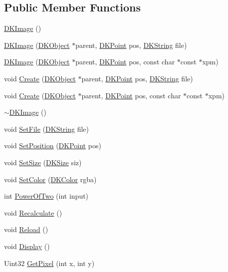 \subsection*{Public Member Functions}
\begin{DoxyCompactItemize}
\item 
\hyperlink{class_d_k_image_a0fb6472b1f681b473283a8be666a0e2f}{D\-K\-Image} ()
\item 
\hyperlink{class_d_k_image_a147d427988ba89b193b6acaf8694736a}{D\-K\-Image} (\hyperlink{class_d_k_object}{D\-K\-Object} $\ast$parent, \hyperlink{_d_k_axis_8h_a0ca1f005fbb936f8e7a7f2433591f418}{D\-K\-Point} pos, \hyperlink{_d_k_string_8h_ac168e8555ceba18e1a2919b21976bc84}{D\-K\-String} file)
\item 
\hyperlink{class_d_k_image_a6f1b063e5b37891cfe02f9992f80530d}{D\-K\-Image} (\hyperlink{class_d_k_object}{D\-K\-Object} $\ast$parent, \hyperlink{_d_k_axis_8h_a0ca1f005fbb936f8e7a7f2433591f418}{D\-K\-Point} pos, const char $\ast$const $\ast$xpm)
\item 
void \hyperlink{class_d_k_image_ab1df6c38356b653eeb4b7a89ce8ec892}{Create} (\hyperlink{class_d_k_object}{D\-K\-Object} $\ast$parent, \hyperlink{_d_k_axis_8h_a0ca1f005fbb936f8e7a7f2433591f418}{D\-K\-Point} pos, \hyperlink{_d_k_string_8h_ac168e8555ceba18e1a2919b21976bc84}{D\-K\-String} file)
\item 
void \hyperlink{class_d_k_image_a81e8c9d2373dead3bad61efef0925474}{Create} (\hyperlink{class_d_k_object}{D\-K\-Object} $\ast$parent, \hyperlink{_d_k_axis_8h_a0ca1f005fbb936f8e7a7f2433591f418}{D\-K\-Point} pos, const char $\ast$const $\ast$xpm)
\item 
\hyperlink{class_d_k_image_ab922d6fe31fac055ff778aacf2fcecce}{$\sim$\-D\-K\-Image} ()
\item 
void \hyperlink{class_d_k_image_af82fafde49cf8d49b03962d0b41cfbf7}{Set\-File} (\hyperlink{_d_k_string_8h_ac168e8555ceba18e1a2919b21976bc84}{D\-K\-String} file)
\item 
void \hyperlink{class_d_k_image_a7c9c2aa6bbefd1c48fabeafe12ec0254}{Set\-Position} (\hyperlink{_d_k_axis_8h_a0ca1f005fbb936f8e7a7f2433591f418}{D\-K\-Point} pos)
\item 
void \hyperlink{class_d_k_image_a7b30ab85d56c3b8fb54d1b8f2fa1062c}{Set\-Size} (\hyperlink{_d_k_axis_8h_aaa25a8c7cbf504fffdb8a4208ff7a731}{D\-K\-Size} siz)
\item 
void \hyperlink{class_d_k_image_a5712863a7b7b597a5827742c2f66dce9}{Set\-Color} (\hyperlink{class_d_k_color}{D\-K\-Color} rgba)
\item 
int \hyperlink{class_d_k_image_ae7939dbf96346daac998ab5ce0db4f3c}{Power\-Of\-Two} (int input)
\item 
void \hyperlink{class_d_k_image_a3ae996ddfd220f76f6f1085746d2f315}{Recalculate} ()
\item 
void \hyperlink{class_d_k_image_aaf2f3e1a44b0b80faee7169cdddd8bec}{Reload} ()
\item 
void \hyperlink{class_d_k_image_a4f9b9a36c0ec826fb6ca9d483b14d9e0}{Display} ()
\item 
Uint32 \hyperlink{class_d_k_image_a88ebda1c5841e9141b5d12e1c85099e8}{Get\-Pixel} (int x, int y)
\end{DoxyCompactItemize}
